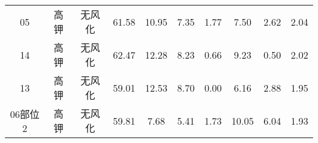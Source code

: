 \documentclass[withoutpreface,bwprint]{cumcmthesis} %
\begin{document}
\begin{appendices}
\begin{table}[!h]
\begin{tabular}{@{}cccccccccc@{}}
		05                                                        & 高钾          & 无风化                                                      & 61.58                                                          & 10.95                                                        & 7.35                                                         & 1.77                                                         & 7.50                                                           & 2.62                                                           & 2.04                                                            \\
		14                                                        & 高钾          & 无风化                                                      & 62.47                                                          & 12.28                                                        & 8.23                                                         & 0.66                                                         & 9.23                                                           & 0.50                                                           & 2.02                                                            \\
		13                                                        & 高钾          & 无风化                                                      & 59.01                                                          & 12.53                                                        & 8.70                                                         & 0.00                                                         & 6.16                                                           & 2.88                                                           & 1.95                                                            \\
		06部位2                                                     & 高钾          & 无风化                                                      & 59.81                                                          & 7.68                                                         & 5.41                                                         & 1.73                                                         & 10.05                                                          & 6.04                                                           & 1.93                                                            \\ \bottomrule
	\end{tabular}
\end{table}


\end{appendices}
\end{document}
